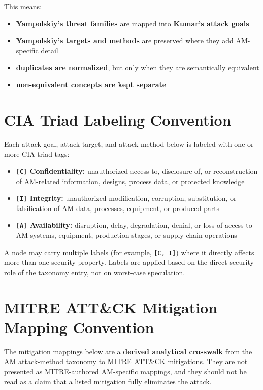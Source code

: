 \documentclass[10pt,a4paper,oneside]{report}
\begin{document}
This means:

\begin{itemize}
\item \textbf{Yampolskiy's threat families} are mapped into \textbf{Kumar's attack goals}
\item \textbf{Yampolskiy's targets and methods} are preserved where they add AM-specific detail
\item \textbf{duplicates are normalized}, but only when they are semantically equivalent
\item \textbf{non-equivalent concepts are kept separate}
\end{itemize}


\chapter{CIA Triad Labeling Convention}


Each attack goal, attack target, and attack method below is labeled with one or more CIA triad tags:

\begin{itemize}
\item \textbf{\texttt{[C]} Confidentiality:} unauthorized access to, disclosure of, or reconstruction of AM-related information, designs, process data, or protected knowledge
\item \textbf{\texttt{[I]} Integrity:} unauthorized modification, corruption, substitution, or falsification of AM data, processes, equipment, or produced parts
\item \textbf{\texttt{[A]} Availability:} disruption, delay, degradation, denial, or loss of access to AM systems, equipment, production stages, or supply-chain operations
\end{itemize}

A node may carry multiple labels (for example, \texttt{[C, I]}) where it directly affects more than one security property. Labels are applied based on the direct security role of the taxonomy entry, not on worst-case speculation.


\chapter{MITRE ATT\&CK Mitigation Mapping Convention}


The mitigation mappings below are a \textbf{derived analytical crosswalk} from the AM attack-method taxonomy to MITRE ATT\&CK mitigations. They are not presented as MITRE-authored AM-specific mappings, and they should not be read as a claim that a listed mitigation fully eliminates the attack.
\end{document}
